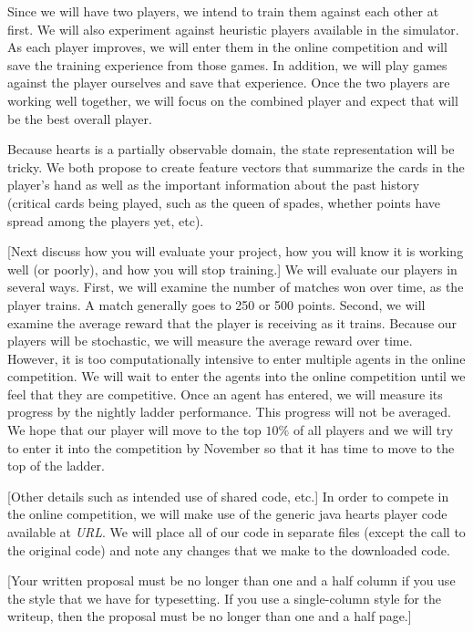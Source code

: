 \documentclass[nohyperref]{article}
\theoremstyle{plain}
\theoremstyle{definition}
\theoremstyle{remark}
\newcommand{\cnote}[1]{\textsf{\color{blue} [#1]}}
\begin{document}
Since we will have two players, we intend to train them against each other at first.  We will also experiment against heuristic players available in the simulator.  As each player improves, we will enter them in the online competition and will save the training experience from those games.  In addition, we will play games against the player ourselves and save that experience.  Once the two players are working well together, we will focus on the combined player and expect that will be the best overall player.

Because hearts is a partially observable domain, the state representation will be tricky.  We both propose to create feature vectors that summarize the cards in the player's hand as well as the important information about the past history (critical cards being played, such as the queen of spades, whether points have spread among the players yet, etc).  

\cnote{Next discuss how you will evaluate your project, how you will know it is working well (or poorly), and how you will stop training.}  We will evaluate our players in several ways.  First, we will examine the number of matches won over time, as the player trains.  A match generally goes to 250 or 500 points.  Second, we will examine the average reward that the player is receiving as it trains.  Because our players will be stochastic, we will measure the average reward over time.  However, it is too computationally intensive to enter multiple agents in the online competition.  We will wait to enter the agents into the online competition until we feel that they are competitive.  Once an agent has entered, we will measure its progress by the nightly ladder performance.  This progress will not be averaged.  We hope that our player will move to the top $10\%$ of all players and we will try to enter it into the competition by November so that it has time to move to the top of the ladder.

\cnote{Other details such as intended use of shared code, etc.}  In order to compete in the online competition, we will make use of the generic java hearts player code available at \textit{URL}.  We will place all of our code in separate files (except the call to the original code) and note any changes that we make to the downloaded code.  

\cnote{Your written proposal must be no longer than one and a half column if you use the style that we have for typesetting.  If you use a single-column style for the writeup, then the proposal must be no longer than one and a half page.}




\end{document}
